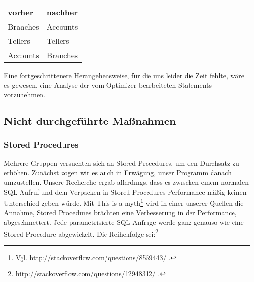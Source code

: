 \documentclass[a4paper, bibliography=totoc, 12pt]{scrartcl}
\begin{document}
	\begin{tabular}{|l|l|}\hline
	\textbf{vorher}&\textbf{nachher}\\\hline
	Branches&Accounts\\\hline
	Tellers&Tellers\\\hline
	Accounts&Branches\\\hline
	\end{tabular}
	
	\vspace{0.5cm}
	
	\noindent	
	Eine fortgeschrittenere Herangehensweise, für die uns leider die Zeit fehlte, wäre es gewesen, eine Analyse der vom Optimizer bearbeiteten Statements vorzunehmen.
	
	
	
	\subsection{Nicht durchgeführte Maßnahmen}

\subsubsection*{Stored Procedures}
Mehrere Gruppen versuchten sich an Stored Procedures, um den Durchsatz zu erhöhen. Zunächst zogen wir es auch in Erwägung, unser Programm danach umzustellen. Unsere Recherche ergab allerdings, dass es zwischen einem normalen SQL-Aufruf und dem Verpacken in Stored Procedures Performance-mäßig keinen Unterschied geben würde. Mit \glqq This is a myth\grqq\footnote{Vgl. \url{http://stackoverflow.com/questions/8559443/ .}} wird in einer unserer Quellen die Annahme, Stored Procedures brächten eine Verbesserung in der Performance, abgeschmettert. Jede parametrisierte SQL-Anfrage werde ganz genauso wie eine Stored Procedure abgewickelt. Die Reihenfolge sei:\footnote{\url{http://stackoverflow.com/questions/12948312/ .}}
\end{document}
